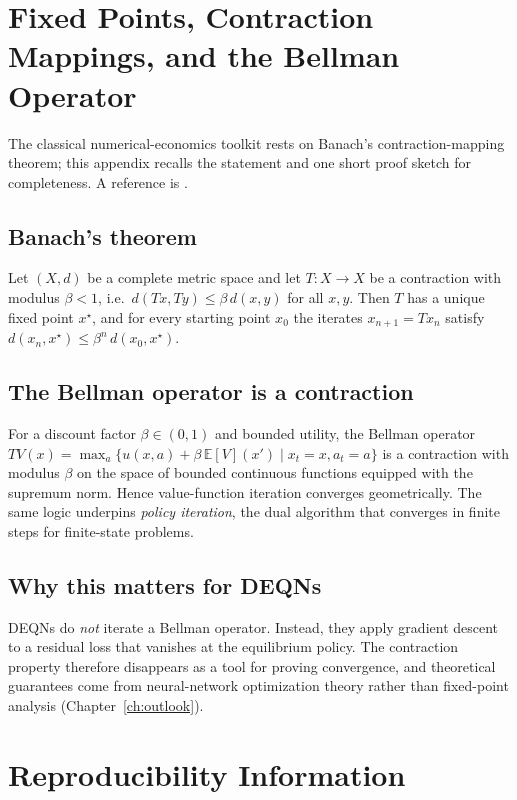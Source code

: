 \documentclass[11pt,a4paper]{report}
\newcommand{\E}[1]{\mathbb{E}\!\left[#1\right]}
\begin{document}
\chapter{Fixed Points, Contraction Mappings, and the Bellman Operator}
\label{app:fixed_points}

The classical numerical-economics toolkit rests on Banach's contraction-mapping theorem; this appendix recalls the statement and one short proof sketch for completeness.  A reference is \citet{stokeylucas1989}.

\section{Banach's theorem}
Let $(X, d)$ be a complete metric space and let $T: X \to X$ be a contraction with modulus $\beta < 1$, i.e.\ $d(T x, T y) \le \beta\, d(x, y)$ for all $x, y$.  Then $T$ has a unique fixed point $x^\star$, and for every starting point $x_0$ the iterates $x_{n+1} = Tx_n$ satisfy $d(x_n, x^\star) \le \beta^n\, d(x_0, x^\star)$.

\section{The Bellman operator is a contraction}
For a discount factor $\beta \in (0,1)$ and bounded utility, the Bellman operator
$T V(x) = \max_a \{u(x,a) + \beta\,\E V(x') \mid x_t = x, a_t = a\}$
is a contraction with modulus $\beta$ on the space of bounded continuous functions equipped with the supremum norm.  Hence value-function iteration converges geometrically.  The same logic underpins \emph{policy iteration}, the dual algorithm that converges in finite steps for finite-state problems.

\section{Why this matters for DEQNs}
DEQNs do \emph{not} iterate a Bellman operator.  Instead, they apply gradient descent to a residual loss that vanishes at the equilibrium policy.  The contraction property therefore disappears as a tool for proving convergence, and theoretical guarantees come from neural-network optimization theory rather than fixed-point analysis (Chapter~\ref{ch:outlook}).

\chapter{Reproducibility Information}
\label{app:reproducibility}
\end{document}
